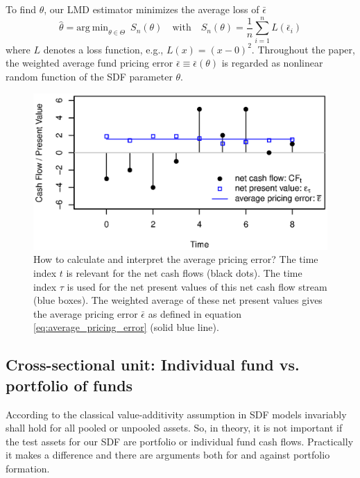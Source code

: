 \documentclass[12pt]{article}
\begin{document}
To find $\theta$, our LMD estimator minimizes the average loss of $\bar{\epsilon}$
\begin{equation}
\label{eq:estimator}
\hat{\theta} = 
\mathrm{arg \ min}_{\theta \in \Theta}
\enspace
S_n(\theta)
\quad
\mathrm{with}
\quad
S_n(\theta) = 
\frac{1}{n}
\sum_{i=1}^n
L \left( \bar{\epsilon}_{i} \right) 
\end{equation}
where $L$ denotes a loss function, e.g., $L(x)=(x-0)^2$.
Throughout the paper, the weighted average fund pricing error $\bar{\epsilon} \equiv \bar{\epsilon}(\theta)$ is regarded as nonlinear random function of the SDF parameter $\theta$.

\begin{figure}[ht]
	\centering
	\includegraphics{eps/npvs.eps}
	\caption{
		How to calculate and interpret the average pricing error?
		The time index $t$ is relevant for the net cash flows (black dots).
		The time index $\tau$ is used for the net present values of this net cash flow stream (blue boxes).
		The weighted average of these net present values gives the average pricing error $\bar{\epsilon}$ as defined in equation \ref{eq:average_pricing_error} (solid blue line).
	}
	\label{fig:npvs}
\end{figure}

\subsection{Cross-sectional unit: Individual fund vs. portfolio of funds}
\label{sec:cross_sectional_unit}

According to the classical value-additivity assumption in \cite{HR87} SDF models invariably shall hold for all pooled or unpooled assets.
So, in theory, it is not important if the test assets for our SDF are portfolio or individual fund cash flows.
Practically it makes a difference and there are arguments both for and against portfolio formation.
\end{document}
